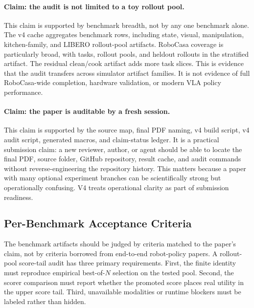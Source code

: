 \paragraph{Claim: the audit is not limited to a toy rollout pool.}
This claim is supported by benchmark breadth, not by any one benchmark alone.
The v4 cache aggregates \VFourWAMBenchmarkRows{} benchmark rows, including
state, visual, manipulation, kitchen-family, and LIBERO rollout-pool artifacts.
RoboCasa coverage is particularly broad, with \VFourWAMRoboCasaTasks{} tasks,
\VFourWAMRoboCasaPools{} rollout pools, and
\VFourWAMRoboCasaEvalSamples{} heldout rollouts in the stratified artifact.
The residual clean/cook artifact adds \VFourWAMRoboCasaResidualTasks{} more
task slices. This is evidence that the audit transfers across simulator
artifact families. It is not evidence of full RoboCasa-wide completion,
hardware validation, or modern VLA policy performance.

\paragraph{Claim: the paper is auditable by a fresh session.}
This claim is supported by the source map, final PDF naming, v4 build script,
v4 audit script, generated macros, and claim-status ledger. It is a practical
submission claim: a new reviewer, author, or agent should be able to locate
the final PDF, source folder, GitHub repository, result cache, and audit
commands without reverse-engineering the repository history. This matters
because a paper with many optional experiment branches can be scientifically
strong but operationally confusing. V4 treats operational clarity as part of
submission readiness.

\subsection{Per-Benchmark Acceptance Criteria}
\label{app:per-benchmark-criteria}

The benchmark artifacts should be judged by criteria matched to the paper's
claim, not by criteria borrowed from end-to-end robot-policy papers. A
rollout-pool score-tail audit has three primary requirements. First, the
finite identity must reproduce empirical best-of-$N$ selection on the tested
pool. Second, the scorer comparison must report whether the promoted score
places real utility in the upper score tail. Third, unavailable modalities or
runtime blockers must be labeled rather than hidden.

